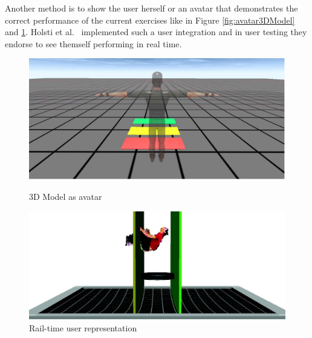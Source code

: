 Another method is to show the user herself or an avatar that demonstrates the correct performance of the current exercises like in Figure \ref{fig:avatar3DModel} and \ref{fig:avatarUser}. Holsti et al.~\cite{Holsti2013-kn} implemented such a user integration and in user testing they endorse to see themself performing in real time.
\begin{figure}[htb]
	\centering
	\begin{minipage}[t]{0.49\linewidth}
		\centering
		\includegraphics[width=1\linewidth]{Pictures/avatar3DModel}
		\caption{3D Model as avatar~\cite{Estepa2016-oj}}
		\label{fig:avatar3DModel}
	\end{minipage}
	\hfill
	\begin{minipage}[t]{0.49\linewidth}
		\centering
		\includegraphics[width=1\linewidth]{Pictures/avatarUser}
		\caption{Rail-time user representation~\cite{Holsti2013-kn}}
		\label{fig:avatarUser}
	\end{minipage}
\end{figure}

